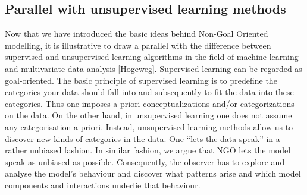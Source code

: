 \subsection{Parallel with unsupervised learning methods}

Now that we have introduced the basic ideas behind Non-Goal Oriented modelling, it is illustrative to draw a parallel with the difference between supervised and unsupervised learning algorithms in the field of machine learning and multivariate data analysis [Hogeweg]. Supervised learning can be regarded as goal-oriented. The basic principle of supervised learning is to predefine the categories your data should fall into and subsequently to fit the data into these categories. Thus one imposes a priori conceptualizations and/or categorizations on the data. On the other hand, in unsupervised learning one does not assume any categorisation a priori. Instead, unsupervised learning methods allow us to discover new kinds of categories in the data. One “lets the data speak” in a rather unbiased fashion. In similar fashion, we argue that NGO lets the model speak as unbiased as possible. Consequently, the observer has to explore and analyse the model’s behaviour and discover what patterns arise and which model components and interactions underlie that behaviour.